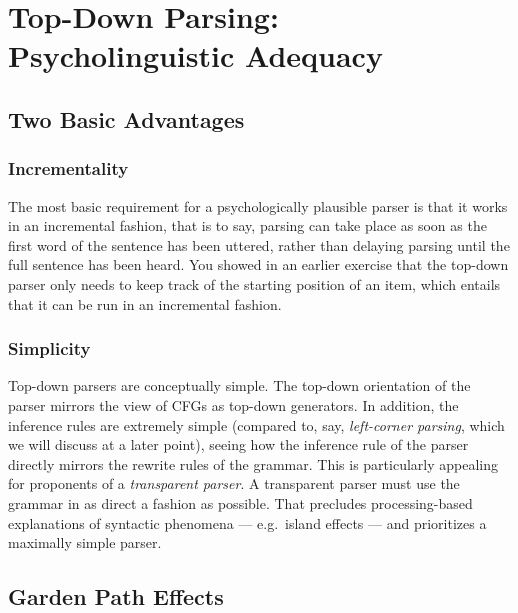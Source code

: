 \chapter{Top-Down Parsing: Psycholinguistic Adequacy}
\label{cha:TopDownEval}

\section{Two Basic Advantages}
\label{sec:TopDownEval_Advantages}

\subsection{Incrementality}
\label{sub:TopDownEval_Incrementality}
The most basic requirement for a psychologically plausible parser is that it works in an incremental fashion, that is to say, parsing can take place as soon as the first word of the sentence has been uttered, rather than delaying parsing until the full sentence has been heard.
You showed in an earlier exercise that the top-down parser only needs to keep track of the starting position of an item, which entails that it can be run in an incremental fashion.

\subsection{Simplicity}
\label{sub:TopDownEval_Simplicity}
Top-down parsers are conceptually simple.
The top-down orientation of the parser mirrors the view of CFGs as top-down generators.
In addition, the inference rules are extremely simple (compared to, say, \emph{left-corner parsing}, which we will discuss at a later point), seeing how the inference rule of the parser directly mirrors the rewrite rules of the grammar.
This is particularly appealing for proponents of a \emph{transparent parser}.
A transparent parser must use the grammar in as direct a fashion as possible.
That precludes processing-based explanations of syntactic phenomena --- e.g.\ island effects --- and prioritizes a maximally simple parser. 

\section{Garden Path Effects}
\label{sec:TopDownEval_GardenPath}

